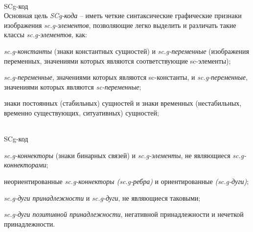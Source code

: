 \begin{frame}{\\SCg-код}
	\topline
	\justifying
	\vspace*{\fill}\\
	Основная цель \textit{SCg-кода} – иметь четкие синтаксические графические признаки изображения \textit{sc.g-элементов}, позволяющие легко выделить и различать такие классы \textit{sc.g-элементов}, как:
	\begin{textitemize}
		\item \textit{ sc.g-константы} (знаки константных сущностей) и \textit{sc.g-переменные} (изображения переменных, значениями которых являются соответствующие sc-элементы);
		\item \textit{sc.g-переменные}, значениями которых являются {sc-константы}, и \textit{sc.g-переменные}, значениями которых являются \textit{sc-переменные};
		\item знаки постоянных (стабильных) сущностей и знаки временных (нестабильных, временно существующих, ситуативных) сущностей;
	\end{textitemize}
	
\end{frame}

\begin{frame}{\\SCg-код}
	\topline
	\justifying
	\begin{textitemize}
		\item \textit{sc.g-коннекторы} (знаки бинарных связей) и \textit{sc.g-элементы}, не являющиеся \textit{sc.g-коннекторами};
		\item неориентированные \textit{sc.g-коннекторы (sc.g-ребра)} и ориентированные \textit{(sc.g-дуги)};
		\item \textit{sc.g-дуги принадлежности} и \textit{sc.g-дуги}, не являющиеся таковыми;
		\item \textit{sc.g-дуги позитивной принадлежности}, негативной принадлежности и нечеткой принадлежности.
	\end{textitemize}
\end{frame}

